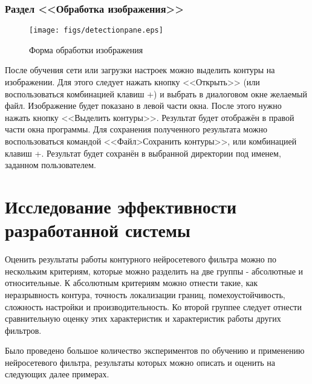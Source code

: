\documentclass[a4paper,12pt]{report}
\begin{document}
\subsection{Раздел <<Обработка изображения>>}
\begin{center}
\begin{figure}[h]
\begin{center}
\texttt{[image: figs/detectionpane.eps]}
\end{center}\caption{Форма обработки изображения}
\label{detectionpane}
\end{figure}
\end{center}
После обучения сети или загрузки настроек можно выделить контуры на изображении. Для этого следует нажать кнопку <<Открыть>> (или воспользоваться комбинацией клавиш \mbox{+}) и выбрать в диалоговом окне желаемый файл. Изображение будет показано в левой части окна. После этого нужно нажать кнопку <<Выделить контуры>>. Результат будет отображён в правой части окна программы. Для сохранения полученного результата можно воспользоваться командой <<Файл>Сохранить контуры>>, или комбинацией клавиш \mbox{+}. Результат будет сохранён в выбранной директории под именем, заданном пользователем.

\chapter{Исследование эффективности разработанной системы}
Оценить результаты работы контурного нейросетевого фильтра можно по нескольким критериям, которые можно разделить на две группы - абсолютные и относительные. К абсолютным критериям можно отнести такие, как неразрывность контура, точность локализации границ, помехоустойчивость, сложность настройки и производительность. Ко второй группее следует отнести сравнительную оценку этих характеристик и характеристик работы других фильтров.

Было проведено большое количество экспериментов по обучению и применению нейросетевого фильтра, результаты которых можно описать и оценить на следующих далее примерах.
\end{document}
